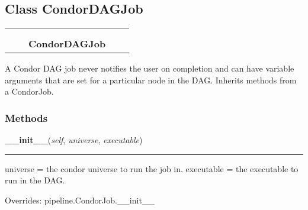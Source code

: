 \subsection{Class CondorDAGJob}

    \label{pipeline:CondorDAGJob}
\begin{tabular}{cccccc}
\multicolumn{2}{r}{\settowidth{\BCL}{pipeline.CondorJob}\multirow{2}{\BCL}{pipeline.CondorJob}}
&&
  \\\cline{3-3}
  &&\multicolumn{1}{c|}{}
&&
  \\
&&\multicolumn{2}{l}{\textbf{CondorDAGJob}}
\end{tabular}

A Condor DAG job never notifies the user on completion and can have 
variable arguments that are set for a particular node in the DAG. 
Inherits methods from a CondorJob.



  \subsubsection{Methods}

    \label{pipeline:CondorDAGJob:__init__}
    \vspace{0.5ex}

    \noindent\begin{boxedminipage}{\textwidth}

    \raggedright \textbf{\_\_init\_\_}(\textit{self}, \textit{universe}, \textit{executable})

    \vspace{-1.5ex}

    \rule{\textwidth}{0.5\fboxrule}
    universe = the condor universe to run the job in. executable = the 
    executable to run in the DAG.

    \vspace{1ex}

      Overrides: pipeline.CondorJob.\_\_init\_\_

    \end{boxedminipage}

    \label{pipeline:CondorDAGJob:add_var_arg}
    \vspace{0.5ex}

